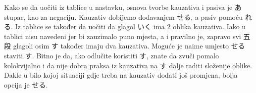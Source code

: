 
\author{Tomislav Mamić}

	
	
	Kako se da uočiti iz tablice u nastavku, osnova tvorbe kauzativa i pasiva je あ stupac, kao za negaciju. Kauzativ dobijemo dodavanjem せる, a pasiv pomoću れる. Iz tablice se također da uočiti da glagol いく ima 2 oblika kauzativa. Iako u tablici nisu navedeni jer bi zauzimalo puno mjesta, a i pravilno je, zapravo svi 五段 glagoli osim す također imaju dva kauzativa. Moguće je naime umjesto せる staviti す. Bitno je da, ako odlučite koristiti す, znate da zvuči pomalo kolokvijalno i da nije dobra praksa iz kauzativa na す dalje raditi složenije oblike. Dakle u bilo kojoj situaciji gdje treba na kauzativ dodati još promjena, bolja opcija je せる.
	
